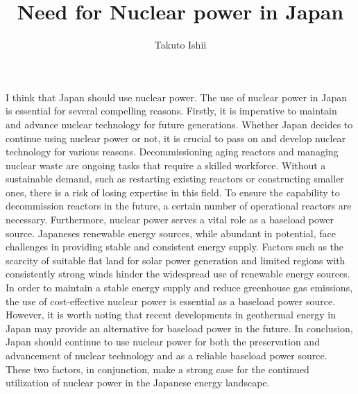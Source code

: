 \documentclass[a4paper, report,notitlepage]{jlreq}
\title{Need for Nuclear power in Japan}
\author{Takuto Ishii}
\begin{document}
\maketitle

I think that Japan should use nuclear power. The use of nuclear power in Japan is essential for several compelling reasons.
Firstly, it is imperative to maintain and advance nuclear technology for future generations. Whether Japan decides to continue using nuclear power or not, it is crucial to pass on and develop nuclear technology for various reasons.
Decommissioning aging reactors and managing nuclear waste are ongoing tasks that require a skilled workforce.
Without a sustainable demand, such as restarting existing reactors or constructing smaller ones, there is a risk of losing expertise in this field. To ensure the capability to decommission reactors in the future, a certain number of operational reactors are necessary. Furthermore, nuclear power serves a vital role as a baseload power source. Japaneses renewable energy sources, while abundant in potential, face challenges in providing stable and consistent energy supply. Factors such as the scarcity of suitable flat land for solar power generation and limited regions with consistently strong winds hinder the widespread use of renewable energy sources. In order to maintain a stable energy supply and reduce greenhouse gas emissions, the use of cost-effective nuclear power is essential as a baseload power source. However, it is worth noting that recent developments in geothermal energy in Japan may provide an alternative for baseload power in the future. In conclusion, Japan should continue to use nuclear power for both the preservation and advancement of nuclear technology and as a reliable baseload power source. These two factors, in conjunction, make a strong case for the continued utilization of nuclear power in the Japanese energy landscape.

\nocite{*}
\printbibliography{}
\end{document}
